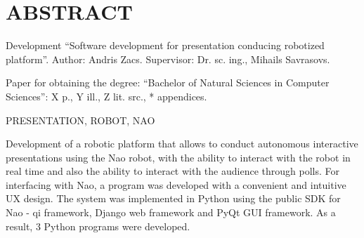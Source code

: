 \documentclass[12pt, fleqn, a4paper]{article}
\begin{document}
\section*{\centering ABSTRACT}
Development \enquote{Software development for presentation conducing robotized platform}. Author: Andris Zacs.
Supervisor: Dr. sc. ing., Mihails Savrasovs.\par
Paper for obtaining the degree: \enquote{Bachelor of Natural Sciences in Computer Sciences}: X p., Y ill., Z lit. src., * appendices.\par
PRESENTATION, ROBOT, NAO\par
Development of a robotic platform that allows to conduct autonomous interactive presentations using the Nao robot, with the ability to interact with the robot in real time and also the ability to interact with the audience through polls.
For interfacing with Nao, a program was developed with a convenient and intuitive UX design.
The system was implemented in Python using the public SDK for Nao - qi framework, Django web framework and PyQt GUI framework.
As a result, 3 Python programs were developed.
\newpage
\end{document}
